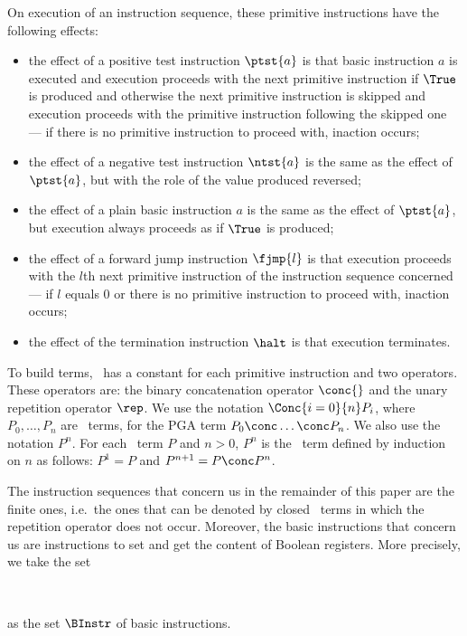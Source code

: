 \documentclass{llncs}
\begin{document}
On execution of an instruction sequence, these primitive instructions
have the following effects:
\begin{itemize}
\item
the effect of a positive test instruction $\ptst{a}$ is that basic
instruction $a$ is executed and execution proceeds with the next
primitive instruction if $\True$ is produced and otherwise the next
primitive instruction is skipped and execution proceeds with the
primitive instruction following the skipped one --- if there is no
primitive instruction to proceed with,
inaction occurs;
\item
the effect of a negative test instruction $\ntst{a}$ is the same as
the effect of $\ptst{a}$, but with the role of the value produced
reversed;
\item
the effect of a plain basic instruction $a$ is the same as the effect
of $\ptst{a}$, but execution always proceeds as if $\True$ is produced;
\item
the effect of a forward jump instruction $\fjmp{l}$ is that execution
proceeds with the $l$th next primitive instruction of the instruction
sequence concerned --- if $l$ equals $0$ or there is no primitive
instruction to proceed with, inaction occurs;
\item
the effect of the termination instruction $\halt$ is that execution
terminates.
\end{itemize}

To build terms, \PGA\ has a constant for each primitive instruction and 
two operators. 
These operators are: the binary concatenation operator ${} \conc {}$ and 
the unary repetition operator ${}\rep$.
We use the notation $\Conc{i = 0}{n} P_i$, where $P_0,\ldots,P_n$ are 
\PGA\ terms, for the PGA term $P_0 \conc \ldots \conc P_n$.
We also use the notation $P^n$. 
For each \PGA\ term $P$ and $n > 0$, $P^n$ is the \PGA\ term defined by 
induction on $n$ as follows: $P^1 = P$ and $P^{n+1} = P \conc P^n$.

The instruction sequences that concern us in the remainder of this paper 
are the finite ones, i.e.\ the ones that can be denoted by closed \PGA\ 
terms in which the repetition operator does not occur. 
Moreover, the basic instructions that concern us are instructions to set 
and get the content of Boolean registers.
More precisely, we take the set
\begin{ldispl}
 \union
{}
\\ \;\; {} \union
{} \union
{} 
\end{ldispl}as the set $\BInstr$ of basic instructions.
\end{document}
